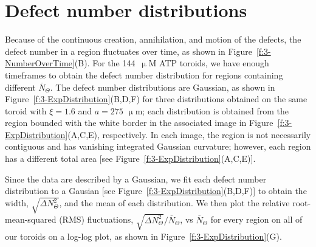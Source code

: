 \section{Defect number distributions}
Because of the continuous creation, annihilation, and motion of the defects, the defect number in a region fluctuates over time, as shown in Figure~\ref{f:3-NumberOverTime}(B).
For the 144~$\upmu$M ATP toroids, we have enough timeframes to obtain the defect number distribution for regions containing different $\overbar{N}_{\Theta}$.
The defect number distributions are Gaussian, as shown in Figure~\ref{f:3-ExpDistribution}(B,D,F) for three distributions obtained on the same toroid with $\xi = 1.6$ and $a = 275$ $\upmu$m; each distribution is obtained from the region bounded with the white border in the associated image in Figure~\ref{f:3-ExpDistribution}(A,C,E), respectively.
In each image, the region is not necessarily contiguous and has vanishing integrated Gaussian curvature; however, each region has a different total area [see Figure~\ref{f:3-ExpDistribution}(A,C,E)].

Since the data are described by a Gaussian, we fit each defect number distribution to a Gausian [see Figure~\ref{f:3-ExpDistribution}(B,D,F)] to obtain the width, $\displaystyle{\sqrt{\Delta N_{\Theta}^2}}$, and the mean of each distribution.
We then plot the relative root-mean-squared (RMS) fluctuations, $\displaystyle{\sqrt{\Delta N_{\Theta}^2}} \bigg / \displaystyle {\overbar{N}_{\Theta}}$, vs $\overbar{N}_{\Theta}$ for every region on all of our toroids on a log-log plot, as shown in Figure~\ref{f:3-ExpDistribution}(G).

